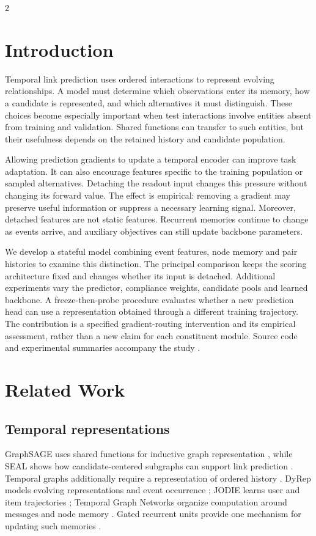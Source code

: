 \documentclass[a4paper,10pt,fleqn]{article}
\begin{document}
\begin{multicols}{2}
\section{Introduction}
Temporal link prediction uses ordered interactions to represent evolving relationships. A model must determine which observations enter its memory, how a candidate is represented, and which alternatives it must distinguish. These choices become especially important when test interactions involve entities absent from training and validation. Shared functions can transfer to such entities, but their usefulness depends on the retained history and candidate population.

Allowing prediction gradients to update a temporal encoder can improve task adaptation. It can also encourage features specific to the training population or sampled alternatives. Detaching the readout input changes this pressure without changing its forward value. The effect is empirical: removing a gradient may preserve useful information or suppress a necessary learning signal. Moreover, detached features are not static features. Recurrent memories continue to change as events arrive, and auxiliary objectives can still update backbone parameters.

We develop a stateful model combining event features, node memory and pair histories to examine this distinction. The principal comparison keeps the scoring architecture fixed and changes whether its input is detached. Additional experiments vary the predictor, compliance weights, candidate pools and learned backbone. A freeze-then-probe procedure evaluates whether a new prediction head can use a representation obtained through a different training trajectory. The contribution is a specified gradient-routing intervention and its empirical assessment, rather than a new claim for each constituent module. Source code and experimental summaries accompany the study \cite{repo}.

\section{Related Work}
\subsection{Temporal representations}
GraphSAGE uses shared functions for inductive graph representation \cite{graphsage}, while SEAL shows how candidate-centered subgraphs can support link prediction \cite{seal}. Temporal graphs additionally require a representation of ordered history \cite{holme,survey}. DyRep models evolving representations and event occurrence \cite{dyrep}; JODIE learns user and item trajectories \cite{jodie}; Temporal Graph Networks organize computation around messages and node memory \cite{tgn}. Gated recurrent units provide one mechanism for updating such memories \cite{gru}.


\end{multicols}
\end{document}
